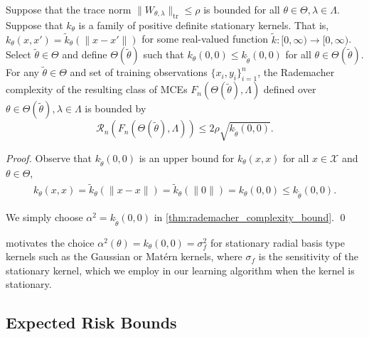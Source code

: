 \documentclass[runningheads, envcountsame, a4paper]{llncs}
\begin{document}
			\begin{corollary}
				\label{thm:rademacher_complexity_stationary_kernels_bound}
				Suppose that the trace norm $\| W_{\theta, \lambda} \|_{\mathrm{tr}} \leq \rho$ is bounded for all $\theta \in \Theta, \lambda \in \Lambda$. Suppose that $k_{\theta}$ is a family of positive definite stationary kernels. That is, $k_{\theta} (x, x') = \tilde{k}_{\theta}( \| x - x' \| )$ for some real-valued function $\tilde{k} : [0, \infty) \to [0, \infty)$. Select $\tilde{\theta} \in \Theta$ and define $\Theta(\tilde{\theta})$ such that $k_{\theta}(0, 0) \leq k_{\tilde{\theta}}(0, 0)$ for all $\theta \in \Theta(\tilde{\theta})$. For any $\tilde{\theta} \in \Theta$ and set of training observations $\{x_{i}, y_{i}\}_{i = 1}^{n}$, the Rademacher complexity of the resulting class of \glspl{MCE} $F_{n}(\Theta(\tilde{\theta}), \Lambda)$ defined over $\theta \in \Theta(\tilde{\theta}), \lambda \in \Lambda$ is bounded by
				\begin{equation}
					\mathcal{R}_{n}(F_{n}(\Theta(\tilde{\theta}), \Lambda)) \leq 2 \rho \sqrt{k_{\tilde{\theta}}(0, 0)}.
				\end{equation}
			\end{corollary}
	
			\begin{proof}
				Observe that $k_{\tilde{\theta}}(0, 0)$ is an upper bound for $k_{\theta}(x, x)$ for all $x \in \mathcal{X}$ and $\theta \in \Theta$,
				\begin{equation}
				\begin{aligned}
					k_{\theta}(x, x) = \tilde{k}_{\theta}( \| x - x \| ) = \tilde{k}_{\theta}( \| 0 \| ) = k_{\theta}(0, 0) \leq k_{\tilde{\theta}}(0, 0).
				\end{aligned}
				\end{equation}
				
				We simply choose $\alpha^{2} = k_{\tilde{\theta}}(0, 0)$ in \cref{thm:rademacher_complexity_bound}.
				\qed
			\end{proof}

			 motivates the choice $\alpha^{2}(\theta) = k_{\theta}(0, 0) = \sigma_{f}^{2}$ for stationary radial basis type kernels such as the Gaussian or Mat\'{e}rn kernels, where $\sigma_{f}$ is the sensitivity \citep{rasmussen2006gaussian} of the stationary kernel, which we employ in our learning algorithm when the kernel is stationary.
	
		\subsection{Expected Risk Bounds}
		\label{app:expected_risk_bounds}
		
\end{document}
